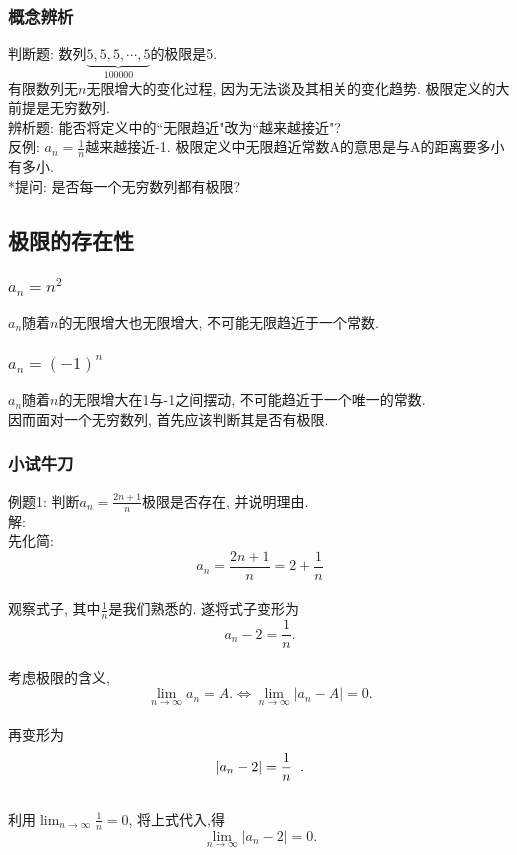 \documentclass{article}
\begin{document}
\begin{CJK}{UTF8}{gkai}
\subsubsection{概念辨析}
判断题: 数列$\underbrace{5, 5, 5, \cdots, 5}_{100000}$的极限是5.\\
有限数列无$n$无限增大的变化过程, 因为无法谈及其相关的变化趋势. 极限定义的大前提是无穷数列.\\
\newline
辨析题:  能否将定义中的``无限趋近"改为``越来越接近"?\\
反例: $a_n = \frac{1}{n}$越来越接近-1. 极限定义中无限趋近常数A的意思是与A的距离要多小有多小.\\

*提问: 是否每一个无穷数列都有极限?
\subsection{极限的存在性}
\subsubsection{$a_n = n^2$}
$a_n$随着$n$的无限增大也无限增大, 不可能无限趋近于一个常数.\\
\subsubsection{$a_n = (-1)^n$}
$a_n$随着$n$的无限增大在1与-1之间摆动, 不可能趋近于一个唯一的常数.\\
\newline
因而面对一个无穷数列, 首先应该判断其是否有极限.
\subsubsection{小试牛刀}
例题1: 判断$a_n = \frac{2n + 1}{n}$极限是否存在, 并说明理由.\\
解:\\先化简: $$a_n = \frac{2n + 1}{n} = 2 + \frac{1}{n}$$\\
观察式子, 其中$\frac{1}{n}$是我们熟悉的. 遂将式子变形为$$a_n - 2 = \frac{1}{n}.$$\\
考虑极限的含义, $$\lim_{n \to \infty}{a_n} = A.\iff \lim_{n \to \infty}{|a_n - A|} = 0.$$\\
再变形为$$|a_n - 2| = \frac{1}{n}\hspace{2mm}.$$\\
利用$\lim_{n \to \infty}{\frac{1}{n}} = 0$, 将上式代入,得$$\lim_{n \to \infty}{|a_n - 2|} = 0.$$



\end{CJK}
\end{document}
